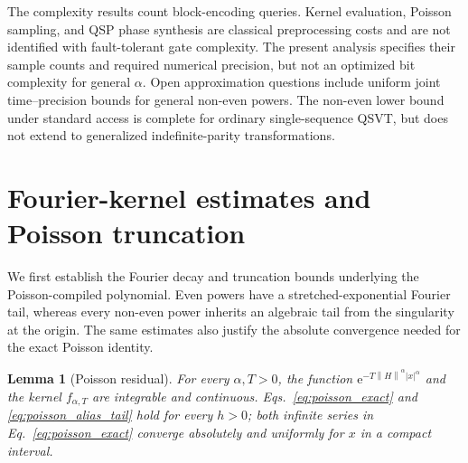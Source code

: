 \documentclass[aps,pra,reprint,floatfix,unsortedaddress,superscriptaddress]{revtex4-2}
\newtheorem{lemma}[theorem]{Lemma}
\newcommand{\norm}[1]{\left\lVert#1\right\rVert}
\newcommand{\abs}[1]{\left\lvert#1\right\rvert}
\begin{document}
The complexity results count block-encoding queries.  Kernel
evaluation, Poisson sampling, and QSP phase synthesis are classical
preprocessing costs and are not identified with fault-tolerant gate
complexity.  The present analysis specifies their sample counts and
required numerical precision, but not an optimized bit complexity for
general $\alpha$.  Open approximation questions include uniform joint
time--precision bounds for general non-even powers.  The non-even lower
bound under standard access is complete for ordinary single-sequence
QSVT, but does not extend to generalized indefinite-parity
transformations.





\clearpage
\onecolumngrid
\appendix
\section{Fourier-kernel estimates and Poisson truncation}
\label{app:kernel}

We first establish the Fourier decay and truncation bounds underlying
the Poisson-compiled polynomial.  Even powers have a
stretched-exponential Fourier tail, whereas every non-even power
inherits an algebraic tail from the singularity at the origin.  The
same estimates also justify the absolute convergence needed for the
exact Poisson identity.

\begin{lemma}[Poisson residual]
\label{lem:poisson_residual}
For every $\alpha,T>0$, the function
$\mathrm e^{-T\norm{H}^{\alpha}\abs{x}^{\alpha}}$ and the kernel
$f_{\alpha,T}$ are integrable and continuous.
Eqs.~\eqref{eq:poisson_exact} and
\eqref{eq:poisson_alias_tail} hold for every $h>0$; both infinite
series in Eq.~\eqref{eq:poisson_exact} converge absolutely and
uniformly for $x$ in a compact interval.
\end{lemma}
\end{document}
